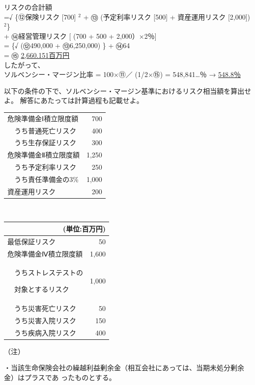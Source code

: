 \documentclass[report,gutter=10mm,fore-edge=10mm,uplatex,dvipdfmx]{jlreq}
\begin{document}
 リスクの合計額\\
 =√ \{⑫保険リスク [700] $^2$ + ⑬ (予定利率リスク [500] + 資産運用リスク [2,000])$^2$\}\\
  + ⑭経営管理リスク [ (700 + 500 + 2,000）×2％]\\
 = \{√ (⑫490,000 + ⑬6,250,000) \} + ⑭64\\
 = ⑮ \underline{2,660.151百万円}\\
 したがって、\\
 ソルベンシー・マージン比率 = 100×⑪／ (1/2×⑮) = 548,841…％ → \underline{548.8％}


以下の条件の下で、ソルベンシー・マージン基準におけるリスク相当額を算出せよ。
解答にあたっては計算過程も記載せよ。

\begin{tabular}[b]{|l|l|r|}
 \hline
\multicolumn{2}{|l|}{危険準備金Ⅰ積立限度額}& 700 \\ \cline{2-3}
 &うち普通死亡リスク & 400 \\ \cline{2-3}
 &うち生存保証リスク & 300 \\ \cline{1-3}
\multicolumn{2}{|l|}{危険準備金Ⅱ積立限度額}& 1,250 \\ \cline{2-3}
 &うち予定利率リスク & 250 \\ \cline{2-3}
 &うち責任準備金の3\% & 1,000 \\ \cline{1-3}
\multicolumn{2}{|l|}{資産運用リスク}& 200 \\ \cline{1-3}
\end{tabular}\ \ \ \
\begin{tabular}[b]{|l|l|r|}
\multicolumn{3}{r}{ (単位:百万円)} \\
\hline
\multicolumn{2}{|l|}{最低保証リスク}& 50 \\ \cline{1-3}
\multicolumn{2}{|l|}{危険準備金Ⅳ積立限度額}& 1,600 \\ \cline{2-3}
 &\multirow{2}{*}{うちストレステストの\par  対象とするリスク }& \multirow{2}{*}{1,000} \\ &&\\ \cline{2-3}
 &うち災害死亡リスク & 50 \\ \cline{2-3}
 &うち災害入院リスク & 150 \\ \cline{2-3}
 &うち疾病入院リスク & 400 \\ \cline{1-3}
\end{tabular}

（注）\par
・当該生命保険会社の繰越利益剰余金（相互会社にあっては、当期未処分剰余金）はプラスであ
ったものとする。
\end{document}
